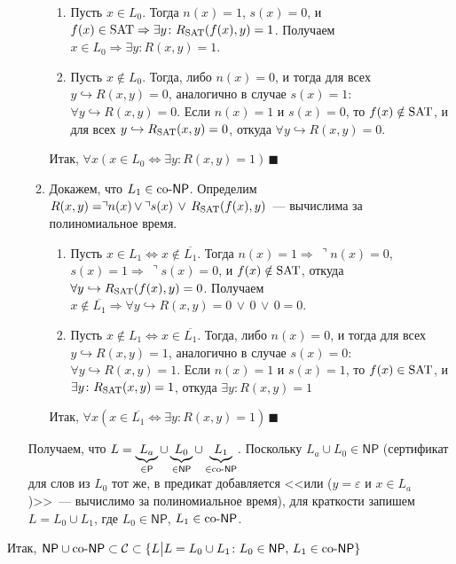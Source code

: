 \documentclass[a4paper]{article}
\def\C{{\cal C}}
\def\PP{{\mathsf{P}}}
\def\NP{{\mathsf{NP}}}
\def\coNP{{\rm co}\text{-}{\mathsf{NP}}}
\def\SAT{{\rm{SAT}}}
\def\eps{\varepsilon}
\begin{document}
\begin{enumerate}
\begin{enumerate}
\begin{enumerate}
\item Пусть $x\in L_0$. Тогда $n(x)=1$, $s(x)=0$, и $f(x)\in\SAT\Rightarrow\exists y\colon R_\SAT(f(x),y)=1$. Получаем $x\in L_0\Rightarrow \exists y\colon R(x,y)=1$.
\item Пусть $x\notin L_0$. Тогда, либо $n(x)=0$, и тогда для всех $y\hookrightarrow R(x,y)=0$, аналогично в случае $s(x)=1$: $\forall y\hookrightarrow R(x,y)=0$. Если $n(x)=1$ и $s(x)=0$, то $f(x)\notin\SAT$, и для всех $y\hookrightarrow R_\SAT(x,y)=0$, откуда $\forall y\hookrightarrow R(x,y)=0$.
\end{enumerate}
Итак, $\forall x(x\in L_0\Leftrightarrow\exists y\colon R(x,y)=1)\,\blacksquare$
\item Докажем, что $L_1\in \coNP$. Определим $R(x,y)=\urcorner n(x)\,\vee\,\urcorner s(x)\,\vee\, R_\SAT(f(x),y)$~--- вычислима за полиномиальное время.\begin{enumerate}
\item Пусть $x\in L_1\Leftrightarrow x\notin \overline{L_1}$. Тогда $n(x)=1\Rightarrow\,\urcorner n(x)=0$, $s(x)=1\Rightarrow\,\urcorner s(x)=0$, и $f(x)\notin\SAT$, откуда $\forall y\hookrightarrow R_\SAT(f(x),y)=0$. Получаем $x\notin \overline{L_1}\Rightarrow \forall y\hookrightarrow R(x,y)=0\,\vee\,0\,\vee\,0=0$.
\item Пусть $x\notin L_1\Leftrightarrow x\in \overline{L_1}$. Тогда, либо $n(x)=0$, и тогда для всех $y\hookrightarrow R(x,y)=1$, аналогично в случае $s(x)=0$: $\forall y\hookrightarrow R(x,y)=1$. Если $n(x)=1$ и $s(x)=1$, то $f(x)\in\SAT$, и $\exists y\colon R_\SAT(x,y)=1$, откуда $\exists y\colon R(x,y)=1$
\end{enumerate}
Итак, $\forall x(x\in \overline{L_1}\Leftrightarrow\exists y\colon R(x,y)=1)\,\blacksquare$
\end{enumerate}
Получаем, что $L=\underbrace{L_a}_{\in \PP}\cup \underbrace{L_0}_{\in \NP}\cup \underbrace{L_1}_{\in\coNP}$.\newline
Поскольку $L_a\cup L_0\in\NP$ (сертификат для слов из $L_0$ тот же, в предикат добавляется <<или ($y=\eps$ и $x\in L_a$)>>~--- вычислимо за полиномиальное время), для краткости запишем $L=L_0\cup L_1$, где $L_0\in\NP$, $L_1\in\coNP$.
\end{enumerate}
Итак, $\NP\cup\coNP\subset \C\subset \{L\big|L=L_0\cup L_1\colon L_0\in\NP,\,L_1\in\coNP\}$
\newpage
\end{document}
